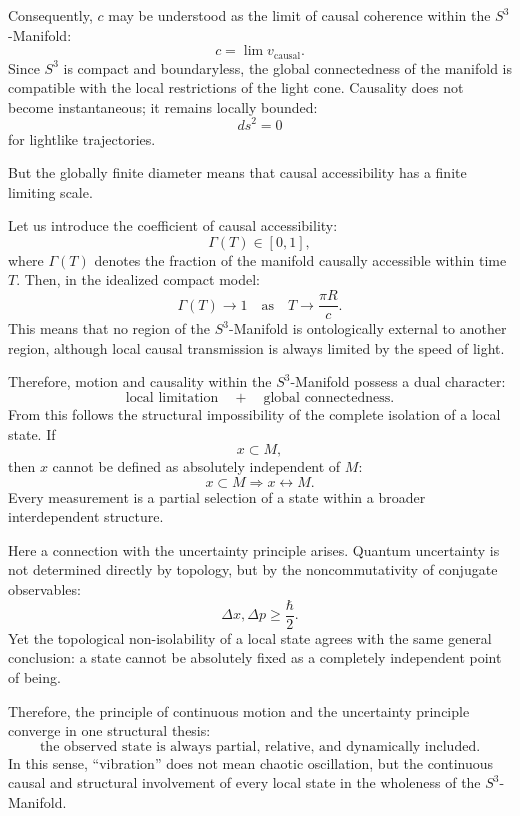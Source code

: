 \documentclass[12pt,a4paper]{article}
\theoremstyle{definition}
\begin{document}
Consequently, \(c\) may be understood as the limit of causal coherence within the \(S^3\)-Manifold:
\[
c=\lim v_{\mathrm{causal}}.
\]
Since \(S^3\) is compact and boundaryless, the global connectedness of the manifold is compatible with the local restrictions of the light cone. Causality does not become instantaneous; it remains locally bounded:
\[
ds^2=0
\]
for lightlike trajectories.

But the globally finite diameter means that causal accessibility has a finite limiting scale.

Let us introduce the coefficient of causal accessibility:
\[
\Gamma(T)\in[0,1],
\]
where \(\Gamma(T)\) denotes the fraction of the manifold causally accessible within time \(T\). Then, in the idealized compact model:
\[
\Gamma(T)\to 1
\quad\text{as}\quad
T\to \frac{\pi R}{c}.
\]
This means that no region of the \(S^3\)-Manifold is ontologically external to another region, although local causal transmission is always limited by the speed of light.

Therefore, motion and causality within the \(S^3\)-Manifold possess a dual character:
\[
\text{local limitation}
\quad+\quad
\text{global connectedness}.
\]
From this follows the structural impossibility of the complete isolation of a local state. If
\[
x\subset M,
\]
then \(x\) cannot be defined as absolutely independent of \(M\):
\[
x\subset M\Rightarrow x\leftrightarrow M.
\]
Every measurement is a partial selection of a state within a broader interdependent structure.

Here a connection with the uncertainty principle arises. Quantum uncertainty is not determined directly by topology, but by the noncommutativity of conjugate observables:
\[
\Delta x,\Delta p\geq \frac{\hbar}{2}.
\]
Yet the topological non-isolability of a local state agrees with the same general conclusion: a state cannot be absolutely fixed as a completely independent point of being.

Therefore, the principle of continuous motion and the uncertainty principle converge in one structural thesis:
\[
\text{the observed state is always partial, relative, and dynamically included.}
\]
In this sense, ``vibration'' does not mean chaotic oscillation, but the continuous causal and structural involvement of every local state in the wholeness of the \(S^3\)-Manifold.
\end{document}
